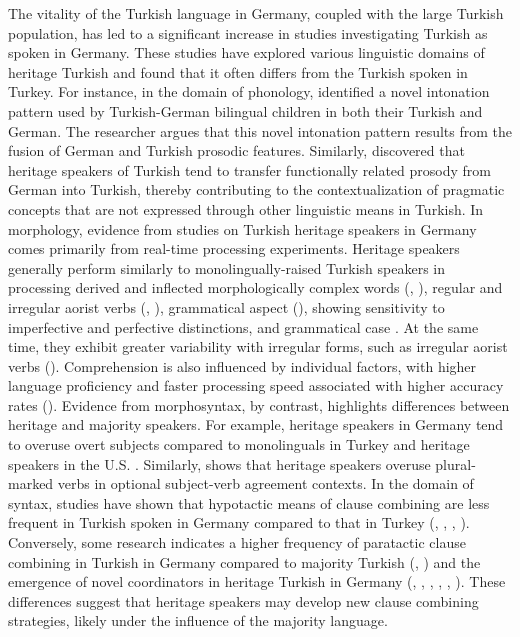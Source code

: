 \largerpage
The vitality of the Turkish language in Germany, coupled with the large Turkish population, has led to a significant increase in studies investigating Turkish as spoken in Germany. These studies have explored various linguistic domains of heritage Turkish and found that it often differs from the Turkish spoken in Turkey. For instance, in the domain of phonology, \citet{Queen2001} identified a novel intonation pattern used by Turkish-German bilingual children in both their Turkish and German. The researcher argues that this novel intonation pattern results from the fusion of German and Turkish prosodic features. Similarly, \citet{Kuhn2019} discovered that heritage speakers of Turkish tend to transfer functionally related prosody from German into Turkish, thereby contributing to the contextualization of pragmatic concepts that are not expressed through other linguistic means in Turkish. In morphology, evidence from studies on Turkish heritage speakers in Germany comes primarily from real-time processing experiments. Heritage speakers generally perform similarly to monolingually-raised Turkish speakers in processing derived and inflected morphologically complex words (\citealt{JacobKırkıcı2016}, \citealt{JacobEtAl2019}), regular and irregular aorist verbs (\citealt{UygunClahsen2021}, \citealt{UygunEtAl2023}), grammatical aspect (\citealt{BuyukyildirimEtAl2025}), showing sensitivity to imperfective and perfective distinctions, and grammatical case \citep{OzsoyEtAl2023}. At the same time, they exhibit greater variability with irregular forms, such as irregular aorist verbs (\citealt{UygunClahsen2021}). Comprehension is also influenced by individual factors, with higher language proficiency and faster processing speed associated with higher accuracy rates (\citealt{BuyukyildirimEtAl2025}). Evidence from morphosyntax, by contrast, highlights differences between heritage and majority speakers. For example, heritage speakers in Germany tend to overuse overt subjects compared to monolinguals in Turkey and heritage speakers in the U.S. \citep{OzsoyEtAl2025}. Similarly, \citet{Uygun2022} shows that heritage speakers overuse plural-marked verbs in optional subject-verb agreement contexts. In the domain of syntax, studies have shown that hypotactic means of clause combining are less frequent in Turkish spoken in Germany compared to that in Turkey (\citealt{Treffers-dallerEtAl2006}, \citealt{Bayram2013}, \citealt{IefremenkoSchroeder2019}, \citealt{Schroeder2025}). Conversely, some research indicates a higher frequency of paratactic clause combining in Turkish in Germany compared to majority Turkish (\citealt{Dollnick2013}, \citealt{Guven2016}) and the emergence of novel coordinators in heritage Turkish in Germany (\citealt{Herkenrath2007}, \citealt{Karakoç2007}, \citealt{HerkenrathKarakoc2007}, \citealt{Csato2016}, \citealt{OzsoyEtAl2022}, \citealt{IefremenkoOezsoySchroeder2024}). These differences suggest that heritage speakers may develop new clause combining strategies, likely under the influence of the majority language.

